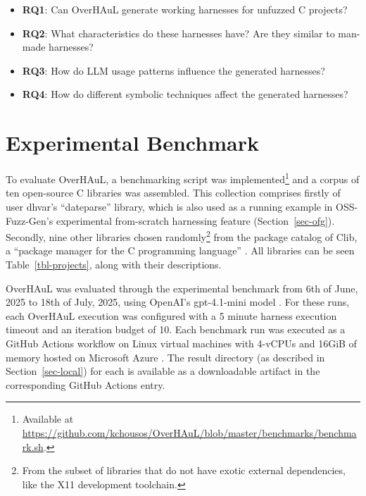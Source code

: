 \documentclass[
  a4paper,
]{scrreprt}
\theoremstyle{definition}
\theoremstyle{remark}
\begin{document}
\begin{itemize}
\item
  \textbf{RQ1}: Can OverHAuL generate working harnesses for unfuzzed C
  projects?
\item
  \textbf{RQ2}: What characteristics do these harnesses have? Are they
  similar to man-made harnesses?
\item
  \textbf{RQ3}: How do LLM usage patterns influence the generated
  harnesses?
\item
  \textbf{RQ4}: How do different symbolic techniques affect the
  generated harnesses?
\end{itemize}

\section{Experimental Benchmark}\label{sec-benchmark}

To evaluate OverHAuL, a benchmarking script was implemented\footnote{Available
  at
  \url{https://github.com/kchousos/OverHAuL/blob/master/benchmarks/benchmark.sh}.}
and a corpus of ten open-source C libraries was assembled. This
collection comprises firstly of user dhvar's ``dateparse'' library,
which is also used as a running example in OSS-Fuzz-Gen's
\autocite{oss-fuzz-gen} experimental from-scratch harnessing feature
(Section~\ref{sec-ofg}). Secondly, nine other libraries chosen
randomly\footnote{From the subset of libraries that do not have exotic
  external dependencies, like the X11 development toolchain.} from the
package catalog of Clib, a ``package manager for the C programming
language'' \autocite{clibs,clib}. All libraries can be seen
Table~\ref{tbl-projects}, along with their descriptions.

OverHAuL was evaluated through the experimental benchmark from 6th of
June, 2025 to 18th of July, 2025, using OpenAI's gpt-4.1-mini model
\autocite{openaidocs2025}. For these runs, each OverHAuL execution was
configured with a 5 minute harness execution timeout and an iteration
budget of 10. Each benchmark run was executed as a GitHub Actions
workflow on Linux virtual machines with 4-vCPUs and 16GiB of memory
hosted on Microsoft Azure \autocite{githubdocs2025a,githubdocs2025}. The
result directory (as described in Section~\ref{sec-local}) for each is
available as a downloadable artifact in the corresponding GitHub Actions
entry.
\end{document}
